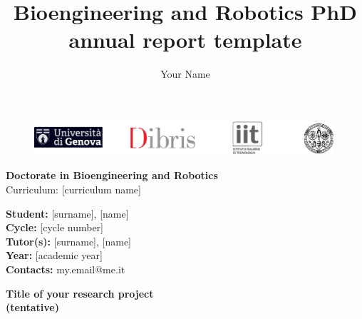 \documentclass[11pt,a4paper]{article}
\author{Your Name}
\title{Bioengineering and Robotics PhD annual report template}
\begin{document}
\begin{figure}[t]
	\centering
	\includegraphics[width=0.99\textwidth]{logos/top_logos.pdf}
\end{figure}
\hphantom{h}\vspace{1.3cm}


\begin{center}
	
\LARGE{\textbf{Doctorate in Bioengineering and Robotics }\vspace{0.4cm}\\
Curriculum: [curriculum name]}

\end{center}

\begin{flushleft}
\vspace{1.5cm}
\large{\textbf{Student: }}\large{{[surname], [name]}}\vspace{0.2cm}\\
\large{\textbf{Cycle: }}\large{[cycle number]}\vspace{0.2cm}\\
\large{\textbf{Tutor(s): }}\large{{[surname], [name]}}\vspace{0.2cm}\\
\large{\textbf{Year: }}\large{[academic year]}\vspace{0.2cm}\\
\large{\textbf{Contacts: }}\large{{my.email@me.it}}
\end{flushleft}
\clearpage
\begin{center}
	\textbf{\normalsize{Title of your research project\\ (tentative)}}
\end{center}









\cleardoublepage

%
%
\printbibliography[notcategory=dontbib]
\end{document}
